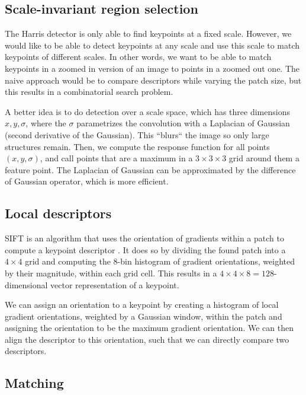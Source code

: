 \subsection{Scale-invariant region selection}

The Harris detector is only able to find keypoints at a fixed scale. However,
we would like to be able to detect keypoints at any scale and use this scale to
match keypoints of different scales. In other words, we want to be able to
match keypoints in a zoomed in version of an image to points in a zoomed out
one. The naive approach would be to compare descriptors while varying the patch
size, but this results in a combinatorial search problem.

A better idea is to do detection over a scale space, which has three dimensions
$x,y,\sigma$, where the $\sigma$ parametrizes the convolution with a Laplacian
of Gaussian (second derivative of the Gaussian). This ``blurs`` the image so only
large structures remain. Then, we compute the response function for all points
$(x,y,\sigma)$, and call points that are a maximum in a $3\times 3\times 3$
grid around them a feature point. The Laplacian of Gaussian can be approximated
by the difference of Gaussian operator, which is more efficient.

\subsection{Local descriptors}

SIFT is an algorithm that uses the orientation of gradients within a patch to
compute a keypoint descriptor \citep{lowe2004distinctive}. It does so by
dividing the found patch into a $4\times 4$ grid and computing the 8-bin
histogram of gradient orientations, weighted by their magnitude, within each
grid cell. This results in a $4\times 4\times 8=128$-dimensional vector
representation of a keypoint.

We can assign an orientation to a keypoint by creating a histogram of local
gradient orientations, weighted by a Gaussian window, within the patch and
assigning the orientation to be the maximum gradient orientation. We can then
align the descriptor to this orientation, such that we can directly compare two
descriptors.

\subsection{Matching}

